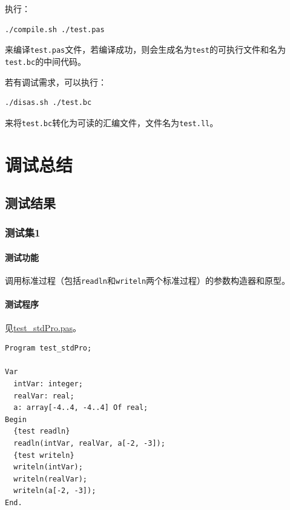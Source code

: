 \documentclass[lang=cn,11pt,a4paper,cite=authornum]{paper}
\begin{document}
执行：

\begin{code}
\begin{verbatim}
./compile.sh ./test.pas
\end{verbatim}
\end{code}

来编译\texttt{test.pas}文件，若编译成功，则会生成名为\texttt{test}的可执行文件和名为\texttt{test.bc}的中间代码。

若有调试需求，可以执行：

\begin{code}
\begin{verbatim}
./disas.sh ./test.bc
\end{verbatim}
\end{code}

来将\texttt{test.bc}转化为可读的汇编文件，文件名为\texttt{test.ll}。

\section{调试总结}

\subsection{测试结果}

\subsubsection{测试集1}

\paragraph{测试功能} 调用标准过程（包括\texttt{readln}和\texttt{writeln}两个标准过程）的参数构造器和原型。

\paragraph{测试程序} 见\href{run:../test/test_stdPro.pas}{test\_stdPro.pas}。

\begin{code}
\begin{verbatim}
Program test_stdPro;

Var 
  intVar: integer;
  realVar: real;
  a: array[-4..4, -4..4] Of real;
Begin
  {test readln}
  readln(intVar, realVar, a[-2, -3]);
  {test writeln}
  writeln(intVar);
  writeln(realVar);
  writeln(a[-2, -3]);
End.
\end{verbatim}
\end{code}
\end{document}
